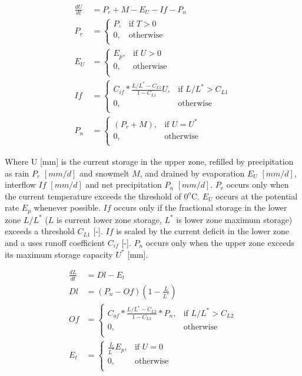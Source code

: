\begin{align}
	\frac{dU}{dt} &= P_r + M -E_U - If - P_n\\
	P_r &= \begin{cases}
		P, &\text{if } T > 0 \\
		0, & \text{otherwise} \\
	\end{cases} \\
	E_U &= \begin{cases}
		E_p, &\text{if } U > 0 \\
		0, &\text{otherwise} \\
	\end{cases} \\
	If &= \begin{cases}
		C_{if}*\frac{L/L^*-C_{L1}}{1-C_{L1}}U, &\text{if } L/L^* > C_{L1}\\
		0, &\text{otherwise}\\
	\end{cases}\\
	P_n &= \begin{cases}
		(P_r + M), &\text{if } U = U^*\\
		0, &\text{otherwise}\\
	\end{cases}	
\end{align}

Where U [mm] is the current storage in the upper zone, refilled by precipitation as rain $P_r$ $[mm/d]$ and snowmelt $M$, and drained by evaporation $E_U$ $[mm/d]$, interflow $If$ $[mm/d]$ and net precipitation $P_n$ $[mm/d]$. 
$P_r$ occurs only when the current temperature exceeds the threshold of $0^o$C. 
$E_U$ occurs at the potential rate $E_p$ whenever possible. 
$If$ occurs only if the fractional storage in the lower zone $L/L^*$ ($L$ is current lower zone storage, $L^*$ is lower zone maximum storage) exceeds a threshold $C_{L1}$ [-]. 
$If$ is scaled by the current deficit in the lower zone and a uses runoff coefficient $C_{if}$ [-]. 
$P_n$ occurs only when the upper zone exceeds its maximum storage capacity $U^*$ [mm].

\begin{align}
	\frac{dL}{dt} &= Dl - E_t \\
	Dl &= (P_n - Of)\left(1-\frac{L}{L^*}\right)\\
	Of &= \begin{cases}
		C_{of}*\frac{L/L^*-C_{L2}}{1-C_{L2}}*P_n, &\text{if } L/L^* > C_{L2}\\
		0, &\text{otherwise}\\
	\end{cases}\\
	E_t &=\begin{cases}
		 \frac{L}{L^*}E_p, &\text{if } U = 0\\
		0, &\text{otherwise}\\
	\end{cases}
\end{align}
  
